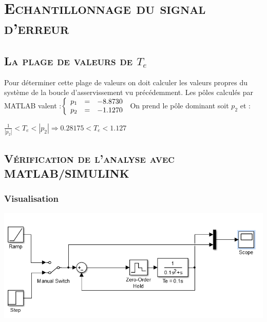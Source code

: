 \chapter{\textsc{Echantillonnage du signal d'erreur }}
\section{\textsc{La plage de valeurs de $T_e$}}

\par Pour déterminer cette plage de valeurs on doit calculer les valeurs propres du système de la boucle d'asservissement vu précédemment. Les pôles calculés par MATLAB valent :$ 
   \left \{
   \begin{array}{r c l}
      p_1  & = & -8.8730 \\
      p_2 & = & -1.1270
   \end{array}
   \right .$ 
   On prend le pôle dominant soit $p_2$  et :
   
   \begin{center}
   		$\frac{1}{|p_2|}<T_e<|p_2| \Rightarrow  0.28175 <T_e< 1.127 $
   \end{center}
  
\section{\textsc{Vérification de l'analyse avec MATLAB/SIMULINK}}

\subsection{Visualisation}

\begin{center}
	\includegraphics[scale=0.5]{shem11.png}
	\label{fig8} 
	\end{center}
	
